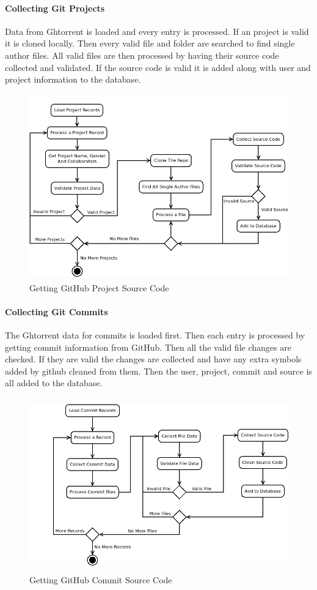 \documentclass{article}
\begin{document}
\paragraph{Collecting Git Projects}
Data from Ghtorrent is loaded and every entry is processed. If an project is valid it is cloned locally. Then every valid file and folder are searched to find single author files. All valid files are then processed by having their source code collected and validated. If the source code is valid it is added along with user and project information to the database.

\begin{figure}[!h]
    \centering
    \includegraphics[height=8cm]{diagrams/projects.png}
    \caption{Getting GitHub Project Source Code}
\end{figure}

\paragraph{Collecting Git Commits}
The Ghtorrent data for commits is loaded first. Then each entry is processed by getting commit information from GitHub. Then all the valid file changes are checked. If they are valid the changes are collected and have any extra symbols added by github cleaned from them. Then the user, project, commit and source is all added to the database.

\begin{figure}[!h]
    \centering
    \includegraphics[height=7.5cm]{diagrams/commits.png}
    \caption{Getting GitHub Commit Source Code}
\end{figure}
\end{document}
